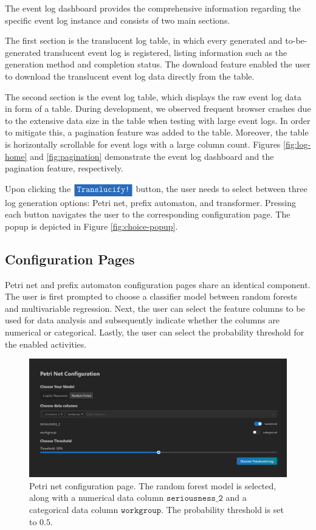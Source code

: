 The event log dashboard provides the comprehensive information regarding the specific event log instance and consists of two main sections.

The first section is the translucent log table, in which every generated and to-be-generated translucent event log is registered, listing information such as the generation method and completion status. The download feature enabled the user to download the translucent event log data directly from the table.

The second section is the event log table, which displays the raw event log data in form of a table. During development, we observed frequent browser crashes due to the extensive data size in the table when testing with large event logs. In order to mitigate this, a pagination feature was added to the table. Moreover, the table is horizontally scrollable for event logs with a large column count. Figures \ref{fig:log-home} and \ref{fig:pagination} demonstrate the event log dashboard and the pagination feature, respectively.

Upon clicking the $\colorbox{NavyBlue}{\textcolor{white}{\texttt{Translucify!}}}$ button, the user needs to select between three log generation options: Petri net, prefix automaton, and transformer. Pressing each button navigates the user to the corresponding configuration page. The popup is depicted in Figure \ref{fig:choice-popup}.

\subsection{Configuration Pages}

Petri net and prefix automaton configuration pages share an identical component. The user is first prompted to choose a classifier model between random forests and multivariable regression. Next, the user can select the feature columns to be used for data analysis and subsequently indicate whether the columns are numerical or categorical. Lastly, the user can select the probability threshold for the enabled activities.

\begin{figure}[H]
    \centering
    \includegraphics[width=\textwidth]{figures/screenshots/petrinetconfig.png}
    \caption{Petri net configuration page. The random forest model is selected, along with a numerical data column $\texttt{seriousness\_2}$ and a categorical data column $\texttt{workgroup}$. The probability threshold is set to $0.5$.}
    \label{fig:petri-net-config}
\end{figure}

